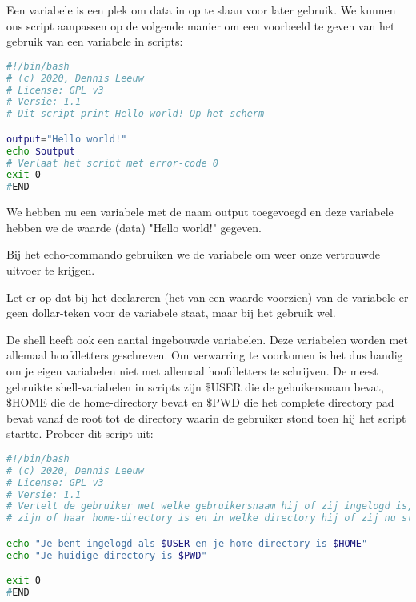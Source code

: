 Een variabele is een plek om data in op te slaan voor later gebruik. We kunnen ons script aanpassen op de volgende manier om een voorbeeld te geven van het gebruik van een variabele in scripts:
\begin{lstlisting}[language=bash]
#!/bin/bash
# (c) 2020, Dennis Leeuw
# License: GPL v3
# Versie: 1.1
# Dit script print Hello world! Op het scherm

output="Hello world!"
echo $output
# Verlaat het script met error-code 0
exit 0
#END
\end{lstlisting}

We hebben nu een variabele met de naam output toegevoegd en deze variabele hebben we de waarde (data) "Hello world!" gegeven.

Bij het echo-commando gebruiken we de variabele om weer onze vertrouwde uitvoer te krijgen.

Let er op dat bij het declareren (het van een waarde voorzien) van de variabele er geen dollar-teken voor de variabele staat, maar bij het gebruik wel.

De shell heeft ook een aantal ingebouwde variabelen. Deze variabelen worden met allemaal hoofdletters geschreven. Om verwarring te voorkomen is het dus handig om je eigen variabelen niet met allemaal hoofdletters te schrijven. De meest gebruikte shell-variabelen in scripts zijn \$USER die de gebuikersnaam bevat, \$HOME die de home-directory bevat en \$PWD die het complete directory pad bevat vanaf de root tot de directory waarin de gebruiker stond toen hij het script startte. Probeer dit script uit:
\begin{lstlisting}[language=bash]
#!/bin/bash
# (c) 2020, Dennis Leeuw
# License: GPL v3
# Versie: 1.1
# Vertelt de gebruiker met welke gebruikersnaam hij of zij ingelogd is, wat
# zijn of haar home-directory is en in welke directory hij of zij nu staat.

echo "Je bent ingelogd als $USER en je home-directory is $HOME"
echo "Je huidige directory is $PWD"

exit 0
#END
\end{lstlisting}

